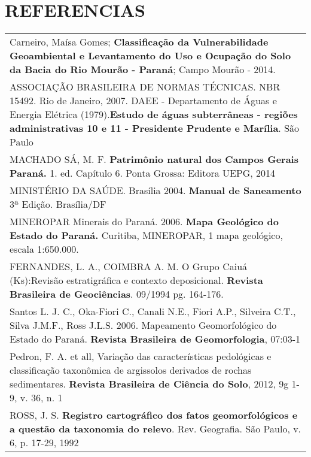 \chapter*{REFERENCIAS}

\begin{tabularx}{\textwidth}{X}
	
	Carneiro, Maísa Gomes; \textbf{Classificação da Vulnerabilidade Geoambiental e
		Levantamento do Uso e Ocupação do Solo da Bacia do
		Rio Mourão - Paraná}; Campo Mourão  - 2014.
	\\\addlinespace
	
	ASSOCIAÇÃO BRASILEIRA DE NORMAS TÉCNICAS. NBR 15492. Rio de Janeiro, 2007.
	DAEE - Departamento de Águas e Energia Elétrica (1979).\textbf{Estudo de águas subterrâneas - regiões administrativas 10 e 11
		- Presidente Prudente e Marília}. São Paulo
	\\\addlinespace
	
	MACHADO SÁ, M. F. \textbf{Patrimônio natural dos Campos Gerais Paraná.} 1. ed. Capítulo
	6. Ponta Grossa: Editora UEPG, 2014\\\addlinespace
	
	MINISTÉRIO DA SAÚDE. Brasília 2004. \textbf{Manual de Saneamento} 3ª Edição. Brasília/DF\\\addlinespace
	
	MINEROPAR Minerais do Paraná. 2006. \textbf{Mapa Geológico do Estado do Paraná.} Curitiba, MINEROPAR, 1 mapa geológico, escala 1:650.000.
	\\\addlinespace
	
	FERNANDES, L. A., COIMBRA A. M. O Grupo Caiuá (Ks):Revisão estratigráfica e contexto deposicional. \textbf{Revista Brasileira de Geociências}. 09/1994 pg. 164-176.
	\\\addlinespace
	
	Santos L. J. C., Oka-Fiori C., Canali N.E., Fiori A.P., Silveira C.T., Silva 
	J.M.F., Ross J.L.S. 2006. Mapeamento Geomorfológico
	do Estado do Paraná. \textbf{Revista Brasileira de Geomorfologia}, 07:03-1
	\\\addlinespace
	
	Pedron, F. A. et all, Variação das características pedológicas e classificação taxonômica de argissolos derivados de rochas sedimentares. \textbf{Revista Brasileira de Ciência do Solo}, 2012, 9g 1-9, v. 36, n. 1
	\\\addlinespace
	
	ROSS, J. S. \textbf{Registro cartográfico dos fatos geomorfológicos e a questão da taxonomia do relevo}. Rev. Geografia. São Paulo,
	v. 6, p. 17-29, 1992
\end{tabularx}

